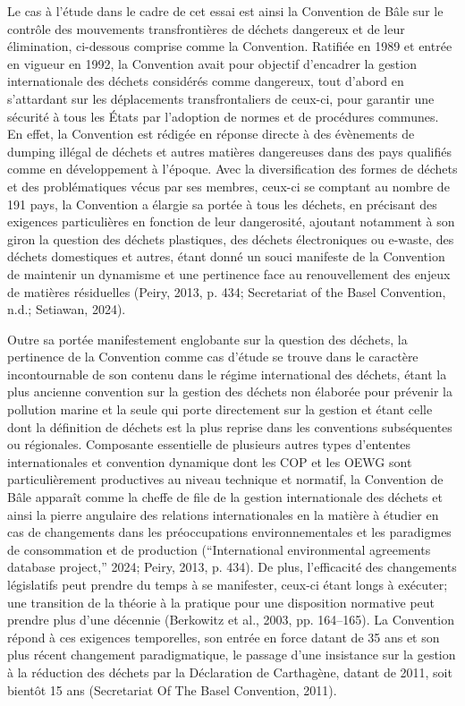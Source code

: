 \documentclass[12pt]{ulaval}
\begin{document}
Le cas à l'étude dans le cadre de cet essai est ainsi la Convention de Bâle sur le contrôle des mouvements transfrontières de déchets dangereux et de leur élimination, ci-dessous comprise comme la Convention. Ratifiée en 1989 et entrée en vigueur en 1992, la Convention avait pour objectif d'encadrer la gestion internationale des déchets considérés comme dangereux, tout d'abord en s'attardant sur les déplacements transfrontaliers de ceux-ci, pour garantir une sécurité à tous les États par l'adoption de normes et de procédures communes. En effet, la Convention est rédigée en réponse directe à des évènements de dumping illégal de déchets et autres matières dangereuses dans des pays qualifiés comme en développement à l'époque. Avec la diversification des formes de déchets et des problématiques vécus par ses membres, ceux-ci se comptant au nombre de 191 pays, la Convention a élargie sa portée à tous les déchets, en précisant des exigences particulières en fonction de leur dangerosité, ajoutant notamment à son giron la question des déchets plastiques, des déchets électroniques ou e-waste, des déchets domestiques et autres, étant donné un souci manifeste de la Convention de maintenir un dynamisme et une pertinence face au renouvellement des enjeux de matières résiduelles (Peiry, 2013, p. 434; Secretariat of the Basel Convention, n.d.; Setiawan, 2024).

Outre sa portée manifestement englobante sur la question des déchets, la pertinence de la Convention comme cas d'étude se trouve dans le caractère incontournable de son contenu dans le régime international des déchets, étant la plus ancienne convention sur la gestion des déchets non élaborée pour prévenir la pollution marine et la seule qui porte directement sur la gestion et étant celle dont la définition de déchets est la plus reprise dans les conventions subséquentes ou régionales. Composante essentielle de plusieurs autres types d'ententes internationales et convention dynamique dont les COP et les OEWG sont particulièrement productives au niveau technique et normatif, la Convention de Bâle apparaît comme la cheffe de file de la gestion internationale des déchets et ainsi la pierre angulaire des relations internationales en la matière à étudier en cas de changements dans les préoccupations environnementales et les paradigmes de consommation et de production ({``International environmental agreements database project,''} 2024; Peiry, 2013, p. 434). De plus, l'efficacité des changements législatifs peut prendre du temps à se manifester, ceux-ci étant longs à exécuter; une transition de la théorie à la pratique pour une disposition normative peut prendre plus d'une décennie (Berkowitz et al., 2003, pp. 164--165). La Convention répond à ces exigences temporelles, son entrée en force datant de 35 ans et son plus récent changement paradigmatique, le passage d'une insistance sur la gestion à la réduction des déchets par la Déclaration de Carthagène, datant de 2011, soit bientôt 15 ans (Secretariat Of The Basel Convention, 2011).
\end{document}
